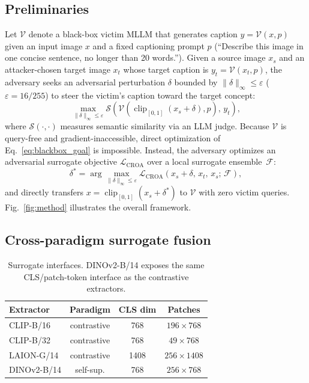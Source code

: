 \documentclass{article}
\begin{document}
\subsection{Preliminaries}
Let $\mathcal{V}$ denote a black-box victim MLLM that generates caption
$y = \mathcal{V}(x, p)$ given an input image $x$ and a fixed captioning
prompt $p$ (``Describe this image in one concise sentence, no longer
than 20 words.''). Given a source image $x_s$ and an attacker-chosen
target image $x_t$ whose target caption is $y_t = \mathcal{V}(x_t, p)$,
the adversary seeks an adversarial perturbation $\delta$ bounded by
$\|\delta\|_\infty \le \varepsilon$ ($\varepsilon = 16/255$) to steer
the victim's caption toward the target concept:
\begin{equation}\label{eq:blackbox_goal}
\max_{\|\delta\|_\infty \le \varepsilon} \mathcal{S}\left(\mathcal{V}(\operatorname{clip}_{[0,1]}(x_s + \delta), p), \, y_t\right),
\end{equation}
where $\mathcal{S}(\cdot, \cdot)$ measures semantic similarity via an
LLM judge. Because $\mathcal{V}$ is query-free and gradient-inaccessible,
direct optimization of Eq.~\eqref{eq:blackbox_goal} is impossible.
Instead, the adversary optimizes an adversarial surrogate objective
$\mathcal{L}_{\mathrm{CROA}}$ over a local surrogate ensemble~$\mathcal{F}$:
\begin{equation}\label{eq:surrogate_opt}
\delta^* = \arg\max_{\|\delta\|_\infty \le \varepsilon} \mathcal{L}_{\mathrm{CROA}}(x_s + \delta, \, x_t, \, x_s; \, \mathcal{F}),
\end{equation}
and directly transfers $x = \operatorname{clip}_{[0,1]}(x_s + \delta^*)$
to $\mathcal{V}$ with zero victim queries. Fig.~\ref{fig:method}
illustrates the overall framework.

\subsection{Cross-paradigm surrogate fusion}
\begin{table}[t]
\centering
\caption{Surrogate interfaces. DINOv2-B/14 exposes the same
CLS/patch-token interface as the contrastive extractors.}
\label{tab:interface}
\small
\setlength{\tabcolsep}{3pt}
\begin{tabular}{lccc}
\toprule
Extractor & Paradigm & CLS dim & Patches \\
\midrule
CLIP-B/16 & contrastive & 768 & $196{\times}768$ \\
CLIP-B/32 & contrastive & 768 & $49{\times}768$ \\
LAION-G/14 & contrastive & 1408 & $256{\times}1408$ \\
DINOv2-B/14 & self-sup. & 768 & $256{\times}768$ \\
\bottomrule
\end{tabular}
\end{table}
\end{document}
